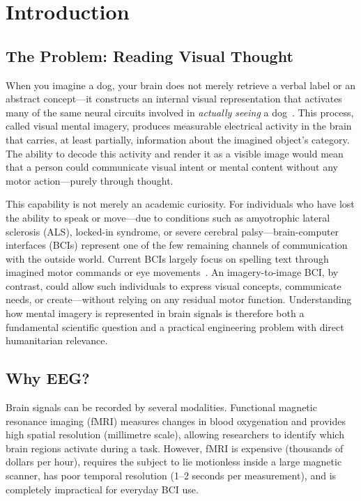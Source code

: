 \documentclass{article}
\begin{document}
\section{Introduction}

\subsection{The Problem: Reading Visual Thought}

When you imagine a dog, your brain does not merely retrieve a verbal label or an abstract concept---it constructs an internal visual representation that activates many of the same neural circuits involved in \emph{actually seeing} a dog~\citep{kosslyn2001neural}. This process, called visual mental imagery, produces measurable electrical activity in the brain that carries, at least partially, information about the imagined object's category. The ability to decode this activity and render it as a visible image would mean that a person could communicate visual intent or mental content without any motor action---purely through thought.

This capability is not merely an academic curiosity. For individuals who have lost the ability to speak or move---due to conditions such as amyotrophic lateral sclerosis (ALS), locked-in syndrome, or severe cerebral palsy---brain-computer interfaces (BCIs) represent one of the few remaining channels of communication with the outside world. Current BCIs largely focus on spelling text through imagined motor commands or eye movements~\citep{birbaumer2000bci}. An imagery-to-image BCI, by contrast, could allow such individuals to express visual concepts, communicate needs, or create---without relying on any residual motor function. Understanding how mental imagery is represented in brain signals is therefore both a fundamental scientific question and a practical engineering problem with direct humanitarian relevance.

\subsection{Why EEG?}

Brain signals can be recorded by several modalities. Functional magnetic resonance imaging (fMRI) measures changes in blood oxygenation and provides high spatial resolution (millimetre scale), allowing researchers to identify which brain regions activate during a task. However, fMRI is expensive (thousands of dollars per hour), requires the subject to lie motionless inside a large magnetic scanner, has poor temporal resolution (1--2 seconds per measurement), and is completely impractical for everyday BCI use.
\end{document}
